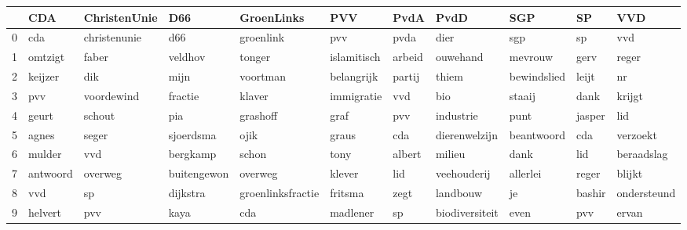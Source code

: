 \begin{tabular}{lllllllllll}
\toprule
{} &       CDA &  ChristenUnie &          D66 &         GroenLinks &          PVV &    PvdA &            PvdD &          SGP &      SP &          VVD \\
\midrule
0 &       cda &  christenunie &          d66 &          groenlink &          pvv &    pvda &            dier &          sgp &      sp &          vvd \\
1 &   omtzigt &         faber &      veldhov &             tonger &  islamitisch &  arbeid &        ouwehand &      mevrouw &    gerv &        reger \\
2 &   keijzer &           dik &         mijn &           voortman &   belangrijk &  partij &           thiem &  bewindslied &   leijt &           nr \\
3 &       pvv &    voordewind &      fractie &             klaver &   immigratie &     vvd &             bio &       staaij &    dank &       krijgt \\
4 &     geurt &        schout &          pia &           grashoff &         graf &     pvv &       industrie &         punt &  jasper &          lid \\
5 &     agnes &         seger &    sjoerdsma &               ojik &        graus &     cda &   dierenwelzijn &   beantwoord &     cda &     verzoekt \\
6 &    mulder &           vvd &     bergkamp &              schon &         tony &  albert &          milieu &         dank &     lid &   beraadslag \\
7 &  antwoord &       overweg &  buitengewon &            overweg &       klever &     lid &     veehouderij &     allerlei &   reger &       blijkt \\
8 &       vvd &            sp &     dijkstra &  groenlinksfractie &      fritsma &    zegt &        landbouw &           je &  bashir &  ondersteund \\
9 &   helvert &           pvv &         kaya &                cda &     madlener &      sp &  biodiversiteit &         even &     pvv &        ervan \\
\bottomrule
\end{tabular}
